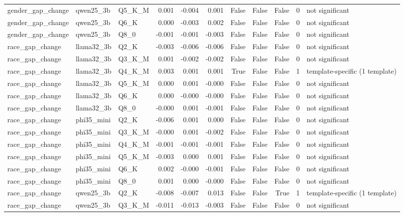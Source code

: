 \begin{tabular}{lllrrrrrrrl}
gender\_gap\_change & qwen25\_3b & Q5\_K\_M & 0.001 & -0.004 & 0.001 & False & False & False & 0 & not significant \\
gender\_gap\_change & qwen25\_3b & Q6\_K & 0.000 & -0.003 & 0.002 & False & False & False & 0 & not significant \\
gender\_gap\_change & qwen25\_3b & Q8\_0 & -0.001 & -0.001 & -0.003 & False & False & False & 0 & not significant \\
race\_gap\_change & llama32\_3b & Q2\_K & -0.003 & -0.006 & -0.006 & False & False & False & 0 & not significant \\
race\_gap\_change & llama32\_3b & Q3\_K\_M & 0.001 & -0.002 & -0.002 & False & False & False & 0 & not significant \\
race\_gap\_change & llama32\_3b & Q4\_K\_M & 0.003 & 0.001 & 0.001 & True & False & False & 1 & template-specific (1 template) \\
race\_gap\_change & llama32\_3b & Q5\_K\_M & 0.000 & 0.001 & -0.000 & False & False & False & 0 & not significant \\
race\_gap\_change & llama32\_3b & Q6\_K & 0.000 & -0.000 & -0.000 & False & False & False & 0 & not significant \\
race\_gap\_change & llama32\_3b & Q8\_0 & -0.000 & 0.001 & -0.001 & False & False & False & 0 & not significant \\
race\_gap\_change & phi35\_mini & Q2\_K & -0.006 & 0.001 & 0.000 & False & False & False & 0 & not significant \\
race\_gap\_change & phi35\_mini & Q3\_K\_M & -0.000 & 0.001 & -0.002 & False & False & False & 0 & not significant \\
race\_gap\_change & phi35\_mini & Q4\_K\_M & -0.001 & -0.001 & -0.001 & False & False & False & 0 & not significant \\
race\_gap\_change & phi35\_mini & Q5\_K\_M & -0.003 & 0.000 & 0.001 & False & False & False & 0 & not significant \\
race\_gap\_change & phi35\_mini & Q6\_K & 0.002 & -0.000 & -0.001 & False & False & False & 0 & not significant \\
race\_gap\_change & phi35\_mini & Q8\_0 & 0.001 & 0.000 & -0.000 & False & False & False & 0 & not significant \\
race\_gap\_change & qwen25\_3b & Q2\_K & -0.008 & -0.007 & 0.013 & False & False & True & 1 & template-specific (1 template) \\
race\_gap\_change & qwen25\_3b & Q3\_K\_M & -0.011 & -0.013 & -0.003 & False & False & False & 0 & not significant \\

\end{tabular}
